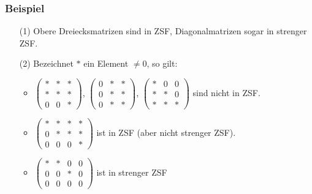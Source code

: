 \subsubsection{Beispiel}
\begin{enumerate}
\item[(1)] Obere Dreiecksmatrizen sind in ZSF, Diagonalmatrizen sogar in strenger ZSF.\\
\item[(2)] Bezeichnet $*$ ein Element $\not= 0$, so gilt:
\begin{itemize}
\item $\left(\begin{array}{ccc}* & * & *\\ * & * & *\\ 0 & 0 & *\end{array}\right)$,
$\left(\begin{array}{ccc}0 & * & *\\ 0 & * & *\\ 0 & * & *\end{array}\right)$,
$\left(\begin{array}{ccc}* & 0 & 0\\ * & * & 0\\ * & * & *\end{array}\right)$
sind nicht in ZSF.
\item $\left(\begin{array}{cccc}* & * & * & *\\ 0 & * & * & *\\ 0 & 0 & 0 & *\end{array}\right)$ ist in ZSF (aber nicht strenger ZSF).
\item $\left(\begin{array}{cccc}* & * & 0 & 0\\ 0 & 0 & * & 0\\ 0 & 0 & 0 & 0\end{array}\right)$ ist in strenger ZSF
\end{itemize}
\end{enumerate}
